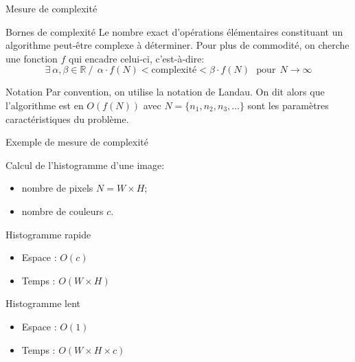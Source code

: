 \begin{frame}{Mesure de complexité}

\begin{block}{Bornes de complexité}
    Le nombre exact d'opérations élémentaires constituant un algorithme peut-être complexe à déterminer. Pour plus de commodité, on cherche une fonction $f$ qui encadre celui-ci, c'est-à-dire:
\begin{equation}
        \exists~ \alpha, \beta \in \mathbb{R} ~/ ~~ \alpha \cdot f(N) < \text{complexité} < \beta \cdot f(N) ~~~\text{pour}~~ N \rightarrow \infty
\end{equation}
\end{block}

\begin{block}{Notation}
    Par convention, on utilise la notation de Landau. On dit alors que l'algorithme est en $O\left(f(N)\right)$ avec
    $N = \{n_1, n_2, n_3, \hdots\}$ sont les paramètres caractéristiques du problème.
\end{block}
\end{frame}

\begin{frame}{Exemple de mesure de complexité}

Calcul de l'histogramme d'une image:
\begin{itemize}
        \item nombre de pixels $N = W\times H$;
        \item nombre de couleurs $c$.
\end{itemize}

\begin{exampleblock}{Histogramme rapide}
  \begin{itemize}
    \item Espace : $O(c)$
    \item Temps : $O(W \times H)$
  \end{itemize}
\end{exampleblock}

\begin{exampleblock}{Histogramme lent}
    \begin{itemize}
        \item Espace : $O(1)$
        \item Temps : $O(W \times H \times c)$
    \end{itemize}
\end{exampleblock}
\end{frame}

